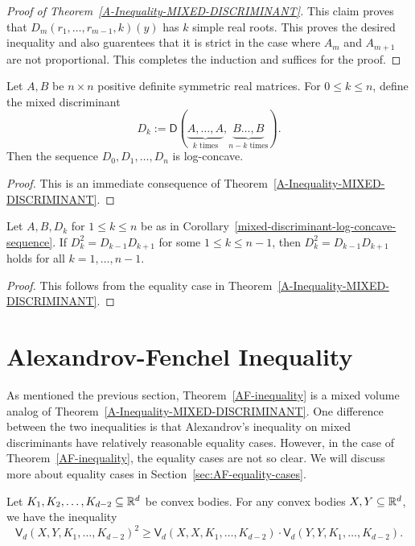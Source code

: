 \documentclass{puthesis-UG}
\begin{document}
\begin{proof}[Proof of Theorem~\ref{A-Inequality-MIXED-DISCRIMINANT}]
	This claim proves that $D_m(r_1, \ldots, r_{m-1}, k)(y)$ has $k$ simple real roots. This proves the desired inequality and also guarentees that it is strict in the case where $A_m$ and $A_{m+1}$ are not proportional. This completes the induction and suffices for the proof. 
\end{proof}


\begin{cor} \label{mixed-discriminant-log-concave-sequence}
	Let $A, B$ be $n \times n$ positive definite symmetric real matrices. For $0 \leq k \leq n$, define the mixed discriminant
	\[
		D_k := \mathsf{D} (\underbrace{A, \ldots, A}_{k \text{ times}}, \underbrace{B \ldots, B}_{n-k \text{ times}}).
	\]
	Then the sequence $D_0, D_1, \ldots, D_n$ is log-concave. 
\end{cor}

\begin{proof}
	This is an immediate consequence of Theorem~\ref{A-Inequality-MIXED-DISCRIMINANT}. 
\end{proof}

\begin{cor} \label{cor-one-implies-all-mixed-discriminants}
	Let $A, B, D_k$ for $1 \leq k \leq n$ be as in Corollary~\ref{mixed-discriminant-log-concave-sequence}. If $D_k^2 = D_{k-1}D_{k+1}$ for some $1 \leq k \leq n-1$, then $D_k^2 = D_{k-1} D_{k+1}$ holds for all $k = 1, \ldots, n-1$. 
\end{cor}

\begin{proof}
	This follows from the equality case in Theorem~\ref{A-Inequality-MIXED-DISCRIMINANT}. 
\end{proof}
\section{Alexandrov-Fenchel Inequality} \label{sec:af-inequality}

As mentioned the previous section, Theorem~\ref{AF-inequality} is a mixed volume analog of Theorem~\ref{A-Inequality-MIXED-DISCRIMINANT}. One difference between the two inequalities is that Alexandrov's inequality on mixed discriminants have relatively reasonable equality cases. However, in the case of Theorem~\ref{AF-inequality}, the equality cases are not so clear. We will discuss more about equality cases in Section~\ref{sec:AF-equality-cases}. 

\begin{thm} \label{AF-inequality}
	Let $K_1, K_2, \ldots, K_{d-2} \subseteq \mathbb{R}^d$ be convex bodies. For any convex bodies $X, Y \subseteq \mathbb{R}^d$, we have the inequality
	\[
		\mathsf{V}_d(X, Y, K_1, \ldots, K_{d-2})^2 \geq \mathsf{V}_d(X, X, K_1, \ldots, K_{d-2}) \cdot \mathsf{V}_d(Y, Y, K_1, \ldots, K_{d-2}). 
	\]
\end{thm}
\end{document}

